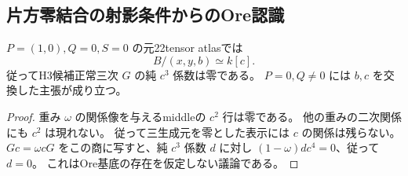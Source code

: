 \subsection{片方零結合の射影条件からのOre認識}
\label{subsec:cubic-third-root-unit-onezero-projection}
\begin{proposition}[片方零結合の曲率のない固有直線商]
\label{prop:cubic-third-root-unit-onezero-pure-c}
$P=(1,0),Q=0,S=0$ の元22tensor atlasでは
\[
 B/(x,y,b)\simeq k[c].
\]
従ってH3候補正常三次 $G$ の純 $c^3$ 係数は零である。
$P=0,Q\ne0$ には $b,c$ を交換した主張が成り立つ。
\end{proposition}
\begin{proof}
重み $\omega$ の関係像を与えるmiddleの $c^2$ 行は零である。
他の重みの二次関係にも $c^2$ は現れない。
従って三生成元を零とした表示には $c$ の関係は残らない。
$Gc=\omega cG$ をこの商に写すと、純 $c^3$ 係数 $d$ に対し
$(1-\omega)d c^4=0$、従って $d=0$。
これはOre基底の存在を仮定しない議論である。
\end{proof}

